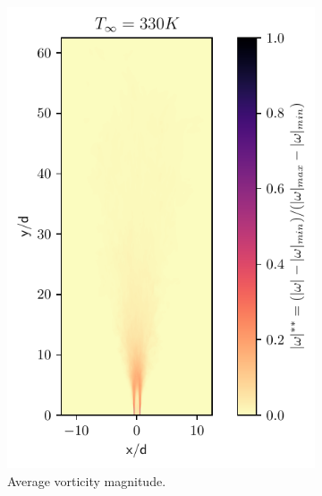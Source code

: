 \begin{figure}[htbp!]
\begin{subfigure}{0.25\textwidth}
	\includegraphics[scale=.65]{figures/Plots/vertical/330/magvort_scaled_vert_avg_330.pdf}
	\caption{Average vorticity magnitude.} \label{330_magvort_3}
\end{subfigure}
\hfill
\begin{subfigure}{0.25\textwidth}
	\centering

\end{subfigure}
\end{figure}
